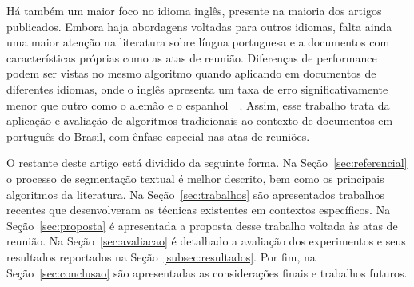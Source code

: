 Há também um maior foco no idioma inglês, presente na maioria dos artigos publicados. Embora haja abordagens voltadas para outros idiomas, falta ainda uma maior atenção na literatura sobre língua portuguesa e a documentos com características próprias como as atas de reunião.
%
Diferenças de performance podem ser vistas no mesmo algoritmo quando aplicando em documentos de diferentes idiomas, onde o inglês apresenta um taxa de erro significativamente menor que outro como o alemão e o espanhol~\cite{Kern2009}~\cite{Sitbon2004}.
%
%
Assim, esse trabalho trata da aplicação e avaliação de algoritmos tradicionais ao contexto de documentos em português do Brasil, com ênfase especial nas atas de reuniões.

O restante deste artigo está dividido da seguinte forma. 
%
Na Seção~\ref{sec:referencial} o processo de segmentação textual é melhor descrito, bem como os principais algoritmos da literatura. 
%
Na Seção~\ref{sec:trabalhos} são apresentados trabalhos recentes que desenvolveram as técnicas existentes em contextos específicos. 
%
%
Na Seção~\ref{sec:proposta} é apresentada a proposta desse trabalho voltada às atas de reunião. 
Na Seção~\ref{sec:avaliacao} é detalhado a avaliação dos experimentos e seus resultados reportados na Seção~\ref{subsec:resultados}. 
%
Por fim, na Seção~\ref{sec:conclusao} são apresentadas as considerações finais e trabalhos futuros.















